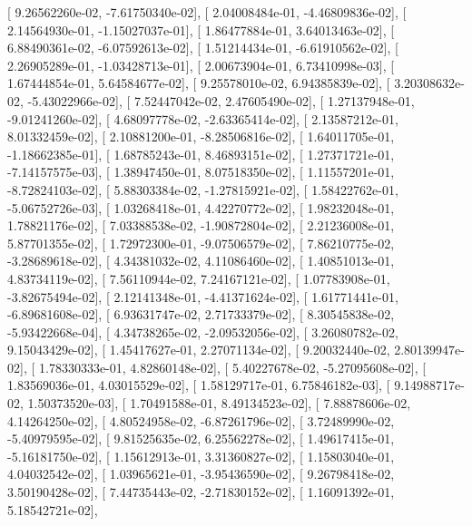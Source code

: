 \documentclass{article}
\begin{document}
       [  9.26562260e-02,  -7.61750340e-02],
       [  2.04008484e-01,  -4.46809836e-02],
       [  2.14564930e-01,  -1.15027037e-01],
       [  1.86477884e-01,   3.64013463e-02],
       [  6.88490361e-02,  -6.07592613e-02],
       [  1.51214434e-01,  -6.61910562e-02],
       [  2.26905289e-01,  -1.03428713e-01],
       [  2.00673904e-01,   6.73410998e-03],
       [  1.67444854e-01,   5.64584677e-02],
       [  9.25578010e-02,   6.94385839e-02],
       [  3.20308632e-02,  -5.43022966e-02],
       [  7.52447042e-02,   2.47605490e-02],
       [  1.27137948e-01,  -9.01241260e-02],
       [  4.68097778e-02,  -2.63365414e-02],
       [  2.13587212e-01,   8.01332459e-02],
       [  2.10881200e-01,  -8.28506816e-02],
       [  1.64011705e-01,  -1.18662385e-01],
       [  1.68785243e-01,   8.46893151e-02],
       [  1.27371721e-01,  -7.14157575e-03],
       [  1.38947450e-01,   8.07518350e-02],
       [  1.11557201e-01,  -8.72824103e-02],
       [  5.88303384e-02,  -1.27815921e-02],
       [  1.58422762e-01,  -5.06752726e-03],
       [  1.03268418e-01,   4.42270772e-02],
       [  1.98232048e-01,   1.78821176e-02],
       [  7.03388538e-02,  -1.90872804e-02],
       [  2.21236008e-01,   5.87701355e-02],
       [  1.72972300e-01,  -9.07506579e-02],
       [  7.86210775e-02,  -3.28689618e-02],
       [  4.34381032e-02,   4.11086460e-02],
       [  1.40851013e-01,   4.83734119e-02],
       [  7.56110944e-02,   7.24167121e-02],
       [  1.07783908e-01,  -3.82675494e-02],
       [  2.12141348e-01,  -4.41371624e-02],
       [  1.61771441e-01,  -6.89681608e-02],
       [  6.93631747e-02,   2.71733379e-02],
       [  8.30545838e-02,  -5.93422668e-04],
       [  4.34738265e-02,  -2.09532056e-02],
       [  3.26080782e-02,   9.15043429e-02],
       [  1.45417627e-01,   2.27071134e-02],
       [  9.20032440e-02,   2.80139947e-02],
       [  1.78330333e-01,   4.82860148e-02],
       [  5.40227678e-02,  -5.27095608e-02],
       [  1.83569036e-01,   4.03015529e-02],
       [  1.58129717e-01,   6.75846182e-03],
       [  9.14988717e-02,   1.50373520e-03],
       [  1.70491588e-01,   8.49134523e-02],
       [  7.88878606e-02,   4.14264250e-02],
       [  4.80524958e-02,  -6.87261796e-02],
       [  3.72489990e-02,  -5.40979595e-02],
       [  9.81525635e-02,   6.25562278e-02],
       [  1.49617415e-01,  -5.16181750e-02],
       [  1.15612913e-01,   3.31360827e-02],
       [  1.15803040e-01,   4.04032542e-02],
       [  1.03965621e-01,  -3.95436590e-02],
       [  9.26798418e-02,   3.50190428e-02],
       [  7.44735443e-02,  -2.71830152e-02],
       [  1.16091392e-01,   5.18542721e-02],
\end{document}
